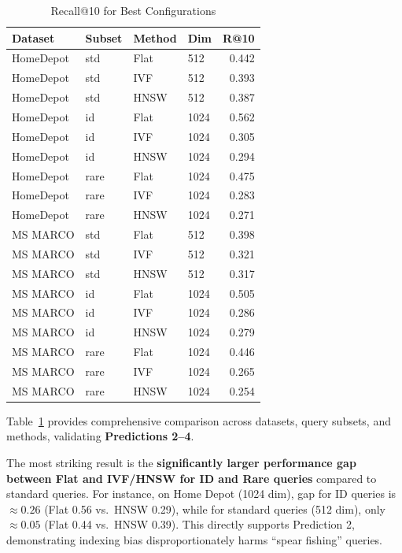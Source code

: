 \documentclass[conference,anonymous]{IEEEtran}
\begin{document}
\begin{table}[t]
\centering
\small
\caption{Recall@10 for Best Configurations}
\label{tab:detailed-results}
\begin{tabular}{llllr}
\toprule
\textbf{Dataset} & \textbf{Subset} & \textbf{Method} & \textbf{Dim} & \textbf{R@10} \\
\midrule
HomeDepot & std & Flat & 512 & 0.442 \\
HomeDepot & std & IVF & 512 & 0.393 \\
HomeDepot & std & HNSW & 512 & 0.387 \\
\midrule
HomeDepot & id & Flat & 1024 & 0.562 \\
HomeDepot & id & IVF & 1024 & 0.305 \\
HomeDepot & id & HNSW & 1024 & 0.294 \\
\midrule
HomeDepot & rare & Flat & 1024 & 0.475 \\
HomeDepot & rare & IVF & 1024 & 0.283 \\
HomeDepot & rare & HNSW & 1024 & 0.271 \\
\midrule
MS MARCO & std & Flat & 512 & 0.398 \\
MS MARCO & std & IVF & 512 & 0.321 \\
MS MARCO & std & HNSW & 512 & 0.317 \\
\midrule
MS MARCO & id & Flat & 1024 & 0.505 \\
MS MARCO & id & IVF & 1024 & 0.286 \\
MS MARCO & id & HNSW & 1024 & 0.279 \\
\midrule
MS MARCO & rare & Flat & 1024 & 0.446 \\
MS MARCO & rare & IVF & 1024 & 0.265 \\
MS MARCO & rare & HNSW & 1024 & 0.254 \\
\bottomrule
\end{tabular}
\end{table}

Table~\ref{tab:detailed-results} provides comprehensive comparison across datasets, query subsets, and methods, validating \textbf{Predictions 2--4}.

The most striking result is the \textbf{significantly larger performance gap between Flat and IVF/HNSW for ID and Rare queries} compared to standard queries. For instance, on Home Depot (1024 dim), gap for ID queries is $\approx 0.26$ (Flat 0.56 vs.\ HNSW 0.29), while for standard queries (512 dim), only $\approx 0.05$ (Flat 0.44 vs.\ HNSW 0.39). This directly supports Prediction 2, demonstrating indexing bias disproportionately harms ``spear fishing'' queries.
\end{document}
